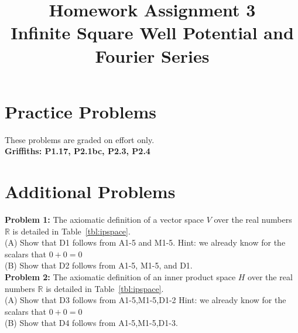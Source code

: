 \documentclass[12pt]{article}
\begin{document}

\date{\vspace{-5ex}}

\title{Homework Assignment 3 \\ Infinite Square Well Potential and Fourier Series}

\maketitle

\section*{Practice Problems}

These problems are graded on effort only.\\

\noindent
{\bf Griffiths: P1.17, P2.1bc, P2.3, P2.4} \\

\section*{Additional Problems}

\noindent
{\bf Problem 1:} The axiomatic definition of a vector space $V$ over the real numbers $\mathbb{R}$ is detailed in Table~\ref{tbl:ipspace}.\\[5pt]
    
\noindent
(A) Show that D1 follows from A1-5 and M1-5.  Hint:  we already know for the scalars that $0+0=0$\\[5pt]

\noindent
(B) Show that D2 follows from A1-5, M1-5, and D1.\\[5pt]

\noindent
{\bf Problem 2:} The axiomatic definition of an inner product space $H$ over the real numbers $\mathbb{R}$ is detailed in Table~\ref{tbl:ipspace}.\\[5pt]
    
\noindent
(A) Show that D3 follows from A1-5,M1-5,D1-2  Hint:  we already know for the scalars that $0+0=0$\\[5pt]

\noindent
(B) Show that D4 follows from A1-5,M1-5,D1-3.

\newpage
\end{document}
